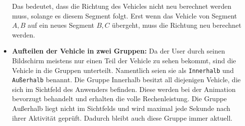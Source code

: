 \begin{itemize}
    Das bedeutet, dass die Richtung des Vehicles nicht neu berechnet werden muss, solange es diesem Segment folgt. Erst wenn das Vehicle von Segment $A,B$ auf ein neues Segment $B,C$ übergeht, muss die Richtung neu berechnet werden.

    \item \textbf{Aufteilen der Vehicle in zwei Gruppen:} Da der User durch seinen Bildschirm meistens nur einen Teil der Vehicle zu sehen bekommt, sind die Vehicle in die Gruppen unterteilt. Namentlich seien sie als \texttt{Innerhalb} und \texttt{Außerhalb} benannt. Die Gruppe Innerhalb besitzt all diejenigen Vehicle, die sich im Sichtfeld des Anwenders befinden. Diese werden bei der Animation bevorzugt behandelt und erhalten die volle Rechenleistung. Die Gruppe Außerhalb liegt nicht im Sichtfelds und wird maximal jede Sekunde nach ihrer Aktivität geprüft. Dadurch bleibt auch diese Gruppe immer aktuell.    
   
  \end{itemize}

